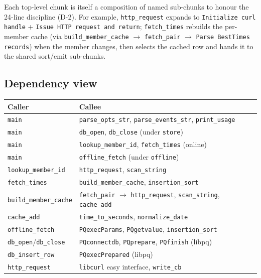 \documentclass[12pt]{article}
\newcommand{\code}[1]{\texttt{#1}}
\begin{document}
Each top-level chunk is itself a composition of named sub-chunks
to honour the 24-line discipline (D-2).  For example,
\code{http\_request} expands to \code{Initialize curl handle} +
\code{Issue HTTP request and return}; \code{fetch\_times} rebuilds the
per-member cache (via \code{build\_member\_cache} $\to$
\code{fetch\_pair} $\to$ \code{Parse BestTimes records}) when the member
changes, then selects the cached row and hands it to the shared
sort/emit sub-chunks.

\subsection{Dependency view}

\begin{center}
\begin{tabular}{ll}
  \toprule
  \textbf{Caller}       & \textbf{Callee}                              \\
  \midrule
  \code{main}           & \code{parse\_opts\_str}, \code{parse\_events\_str}, \code{print\_usage} \\
  \code{main}           & \code{db\_open}, \code{db\_close} (under \code{store}) \\
  \code{main}           & \code{lookup\_member\_id}, \code{fetch\_times} (online) \\
  \code{main}           & \code{offline\_fetch} (under \code{offline})            \\
  \code{lookup\_member\_id} & \code{http\_request}, \code{scan\_string}          \\
  \code{fetch\_times}   & \code{build\_member\_cache}, \code{insertion\_sort}      \\
  \code{build\_member\_cache} & \code{fetch\_pair} $\to$ \code{http\_request},
                          \code{scan\_string}, \code{cache\_add}                 \\
  \code{cache\_add}     & \code{time\_to\_seconds}, \code{normalize\_date}         \\
  \code{offline\_fetch} & \code{PQexecParams}, \code{PQgetvalue},
                          \code{insertion\_sort}                          \\
  \code{db\_open}/\code{db\_close} & \code{PQconnectdb}, \code{PQprepare},
                          \code{PQfinish} (libpq)                         \\
  \code{db\_insert\_row} & \code{PQexecPrepared} (libpq)                  \\
  \code{http\_request}  & \code{libcurl} easy interface, \code{write\_cb} \\
  \bottomrule
\end{tabular}
\end{center}
\end{document}
